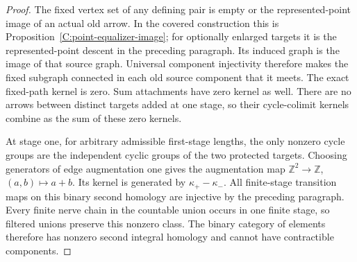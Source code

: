 \begin{proof}
The fixed vertex set of any defining pair is empty or the
represented-point image of an actual old arrow. In the covered
construction this is Proposition~\ref{C:point-equalizer-image};
for optionally enlarged targets it is the represented-point
descent in the preceding paragraph. Its induced graph is the
image of that source graph. Universal component
injectivity therefore makes the fixed subgraph connected in
each old source component that it meets. The exact fixed-path
kernel is zero. Sum attachments have zero kernel as well.
There are no arrows between distinct targets added at one stage,
so their cycle-colimit kernels combine as the sum of these zero
kernels.

At stage one, for arbitrary admissible first-stage lengths, the
only nonzero cycle groups are the independent cyclic groups
of the two protected targets. Choosing generators of edge
augmentation one gives the augmentation map
$\mathbb Z^2\to\mathbb Z$, $(a,b)\mapsto a+b$. Its kernel is
generated by $\kappa_+-\kappa_-$. All finite-stage transition
maps on this binary second homology are injective by the preceding
paragraph. Every finite nerve chain in the countable union
occurs in one finite stage, so filtered unions preserve this
nonzero class. The binary category of elements therefore has
nonzero second integral homology and cannot have contractible
components.
\end{proof}

